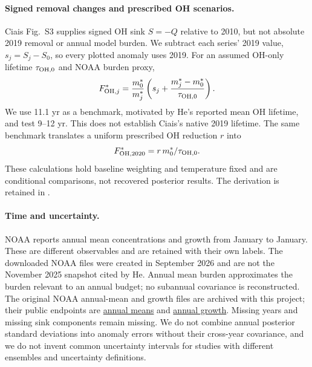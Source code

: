 \documentclass[11pt]{article}
\begin{document}
\paragraph{Signed removal changes and prescribed OH scenarios.}
Ciais Fig.~S3 supplies signed OH sink $S=-Q$ relative to 2010, but not
absolute 2019 removal or annual model burden. We subtract each series'
2019 value, $s_j=S_j-S_0$, so every plotted anomaly uses 2019. For an
assumed OH-only lifetime $\tau_{{\rm OH},0}$ and NOAA burden proxy,
\begin{equation}\label{eq:ciais}
F^*_{{\rm OH},j}=\frac{m^*_0}{m^*_j}
\left(s_j+\frac{m^*_j-m^*_0}{\tau_{{\rm OH},0}}\right).
\end{equation}
We use 11.1 yr as a benchmark, motivated by He's reported mean OH lifetime,
and test 9--12 yr. This does not establish Ciais's native 2019 lifetime.
The same benchmark translates a uniform prescribed OH reduction $r$ into
\begin{equation}\label{eq:uniform}
F^*_{{\rm OH},2020}=r\,m^*_0/\tau_{{\rm OH},0}.
\end{equation}
These calculations hold baseline weighting and temperature fixed and are
conditional comparisons, not recovered posterior results. The derivation is
retained in .

\paragraph{Time and uncertainty.}
NOAA reports annual mean concentrations and growth from January to January.
These are different observables and are retained with their own labels.
The downloaded NOAA files were created in September 2026 and are not the
November 2025 snapshot cited by He. Annual mean burden approximates the
burden relevant to an annual budget; no subannual covariance is reconstructed.
The original NOAA annual-mean and growth files are archived with this project;
their public endpoints are
\href{https://gml.noaa.gov/webdata/ccgg/trends/ch4/ch4_annmean_gl.txt}{annual means}
and \href{https://gml.noaa.gov/webdata/ccgg/trends/ch4/ch4_gr_gl.txt}{annual growth}.
Missing years and missing sink components remain missing. We do not combine
annual posterior standard deviations into anomaly errors without their
cross-year covariance, and we do not invent common uncertainty intervals
for studies with different ensembles and uncertainty definitions.
\end{document}
